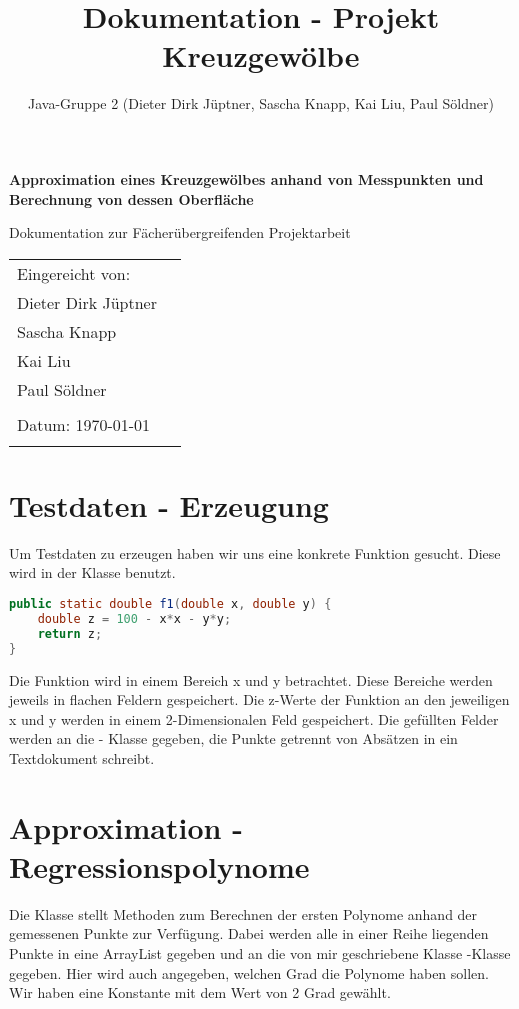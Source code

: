 \documentclass[11pt, bibliography=totocnumbered]{scrartcl}
\title{Dokumentation - Projekt Kreuzgew\"olbe}
\author{Java-Gruppe 2 (Dieter Dirk J\"uptner, Sascha Knapp, Kai Liu, Paul S\"oldner)}
\begin{document}
	\begin{titlepage}
		\begin{center}
			\vspace*{2cm}
			
			\huge
			\textbf{Approximation eines Kreuzgew\"olbes anhand von Messpunkten und Berechnung von dessen Oberfl\"ache}
			
			\vspace{1.5cm}
			\LARGE
			Dokumentation zur F\"acher\"ubergreifenden Projektarbeit
		\end{center}    
		\vspace{1cm}
		
		\vfill{}
		\large
		\begin{tabular}{@{}l l}
			Eingereicht von: & \\
			Dieter Dirk J\"uptner \\
			Sascha Knapp \\
			Kai Liu \\
			Paul S\"oldner \\
			\\
			Datum: \today \\
			\\
		\end{tabular}
		\vfill
	\end{titlepage}
\newpage
\tableofcontents
\newpage
\section{Testdaten - Erzeugung}

Um Testdaten zu erzeugen haben wir uns eine konkrete Funktion gesucht. Diese wird in der Klasse \grqq benutzt.

\begin{lstlisting}[caption={Funktion zur Testdaten-Erzeugung}, label={lst:label}, language=Java]
public static double f1(double x, double y) {
	double z = 100 - x*x - y*y;
	return z;
}
\end{lstlisting}

Die Funktion wird in einem Bereich x und y betrachtet. Diese Bereiche werden jeweils in flachen Feldern gespeichert. Die z-Werte der Funktion an den jeweiligen x und y werden in einem 2-Dimensionalen Feld gespeichert.
Die gef\"ullten Felder werden an die \grqq - Klasse gegeben, die Punkte getrennt von Abs\"atzen in ein Textdokument schreibt.

\section{Approximation - Regressionspolynome}
Die Klasse \grqq stellt Methoden zum Berechnen der ersten Polynome anhand der gemessenen Punkte zur Verf\"ugung. Dabei werden alle in einer Reihe liegenden Punkte in eine ArrayList gegeben und an die von mir geschriebene Klasse \grqq-Klasse gegeben. Hier wird auch angegeben, welchen Grad die Polynome haben sollen. Wir haben eine Konstante mit dem Wert von 2 Grad gew\"ahlt.
\end{document}
